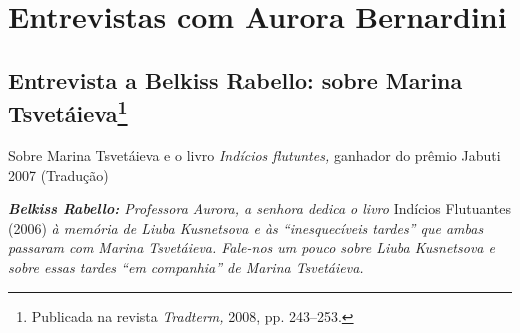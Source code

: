 \part{Entrevistas com Aurora Bernardini}

\chapter{Entrevista a Belkiss Rabello: sobre Marina Tsvetáieva\footnote{Publicada na revista
  \emph{Tradterm,} 2008, pp. 243--253.}}

Sobre Marina Tsvetáieva e o livro \emph{Indícios flutuntes,} ganhador do
prêmio Jabuti 2007 (Tradução)

\emph{\textbf{Belkiss Rabello:} Professora Aurora, a senhora dedica o
livro} Indícios Flutuantes (2006) \emph{à memória de Liuba Kusnetsova e
às ``inesquecíveis tardes'' que ambas passaram com Marina Tsvetáieva.
Fale-nos um pouco sobre Liuba Kusnetsova e sobre essas tardes ``em
companhia'' de Marina Tsvetáieva.}

